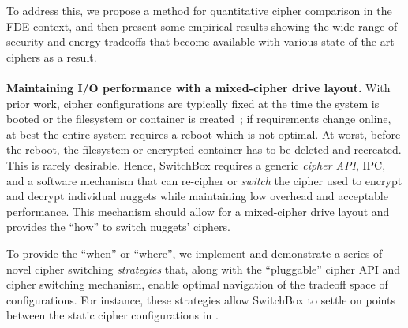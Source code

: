 To address this, we propose a method for quantitative cipher comparison in the
FDE context, and then present some empirical results showing the wide range of
security and energy tradeoffs that become available with various
state-of-the-art ciphers as a result.\\
\\
\textbf{Maintaining I/O performance with a mixed-cipher drive layout.} With
prior work, cipher configurations are typically fixed at the time the system is
booted or the filesystem or container is created~\cite{CiteAllTheFilesystems}; if
requirements change online, at best the entire system requires a reboot which is
not optimal. At worst, before the reboot, the filesystem or encrypted container
has to be deleted and recreated. This is rarely desirable. Hence, SwitchBox
requires a generic \emph{cipher API}, IPC, and a software mechanism that can
re-cipher or \emph{switch} the cipher used to encrypt and decrypt individual
nuggets while maintaining low overhead and acceptable performance. This
mechanism should allow for a mixed-cipher drive layout and provides the ``how''
to switch nuggets' ciphers.

To provide the ``when'' or ``where'', we implement and demonstrate a series of
novel cipher switching \textit{strategies} that, along with the ``pluggable''
cipher API and cipher switching mechanism, enable optimal navigation of the
tradeoff space of configurations. For instance, these strategies allow SwitchBox
to settle on points between the static cipher configurations in
.

